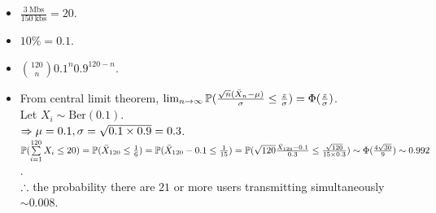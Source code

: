 \begin{pr}$ $
\begin{itemize}
\item $\frac{3\ \mathrm{Mbs}}{150\ \mathrm{kbs}}=20$.
\item $10\%=0.1$.
\item $\binom{120}n0.1^n0.9^{120-n}$.
\item %
From central limit theorem, $\lim_{n\to\infty}\P(\frac{\sqrt n(\bar X_n-\mu)}\sigma\leq\frac z\sigma)=\Phi(\frac z\sigma)$.\\
Let $X_i\sim\mathrm{Ber}(0.1)$.\\
$\then\mu=0.1, \sigma=\sqrt{0.1\times0.9}=0.3$.\\
$\P(\suml_{i=1}^{120}X_i\leq20)=\P(\bar X_{120}\leq\frac16)=\P(\bar X_{120}-0.1\leq\frac1{15})=\P(\sqrt{120}\frac{\bar X_{120}-0.1}{0.3}\leq\frac{\sqrt{120}}{15\times0.3})\sim\Phi(\frac{4\sqrt{30}}9)\sim0.992$.\\
$\so$ the probability there are $21$ or more users transmitting simultaneously $\sim0.008$.
\end{itemize}
\end{pr}
